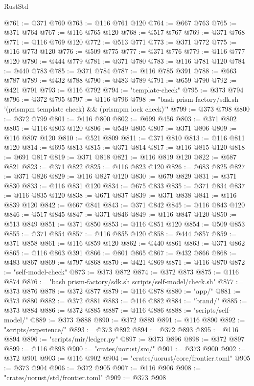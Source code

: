 \begin{lexlean}{RustStd}
\begin{coremodule}
@761 := @371 @760
@763 := @116 @761 @120
@764 := @667 @763
@765 := @371 @764
@767 := @116 @765 @120
@768 := @517 @767
@769 := @371 @768
@771 := @116 @769 @120
@772 := @513 @771
@773 := @371 @772
@775 := @116 @773 @120
@776 := @509 @775
@777 := @371 @776
@779 := @116 @777 @120
@780 := @444 @779
@781 := @371 @780
@783 := @116 @781 @120
@784 := @440 @783
@785 := @371 @784
@787 := @116 @785 @391
@788 := @663 @787
@789 := @432 @788
@790 := @483 @789
@791 := @659 @790
@792 := @421 @791
@793 := @116 @792
@794 := "template-check"
@795 := @373 @794
@796 := @372 @795
@797 := @116 @796
@798 := "bash prism-factory/sdk.sh '(prismpm template check) && (prismpm lock check)'"
@799 := @373 @798
@800 := @372 @799
@801 := @116 @800
@802 := @699 @456
@803 := @371 @802
@805 := @116 @803 @120
@806 := @549 @805
@807 := @371 @806
@809 := @116 @807 @120
@810 := @521 @809
@811 := @371 @810
@813 := @116 @811 @120
@814 := @695 @813
@815 := @371 @814
@817 := @116 @815 @120
@818 := @691 @817
@819 := @371 @818
@821 := @116 @819 @120
@822 := @687 @821
@823 := @371 @822
@825 := @116 @823 @120
@826 := @683 @825
@827 := @371 @826
@829 := @116 @827 @120
@830 := @679 @829
@831 := @371 @830
@833 := @116 @831 @120
@834 := @675 @833
@835 := @371 @834
@837 := @116 @835 @120
@838 := @671 @837
@839 := @371 @838
@841 := @116 @839 @120
@842 := @667 @841
@843 := @371 @842
@845 := @116 @843 @120
@846 := @517 @845
@847 := @371 @846
@849 := @116 @847 @120
@850 := @513 @849
@851 := @371 @850
@853 := @116 @851 @120
@854 := @509 @853
@855 := @371 @854
@857 := @116 @855 @120
@858 := @444 @857
@859 := @371 @858
@861 := @116 @859 @120
@862 := @440 @861
@863 := @371 @862
@865 := @116 @863 @391
@866 := @801 @865
@867 := @432 @866
@868 := @483 @867
@869 := @797 @868
@870 := @421 @869
@871 := @116 @870
@872 := "self-model-check"
@873 := @373 @872
@874 := @372 @873
@875 := @116 @874
@876 := "bash prism-factory/sdk.sh scripts/self-model/check.sh"
@877 := @373 @876
@878 := @372 @877
@879 := @116 @878
@880 := "app/"
@881 := @373 @880
@882 := @372 @881
@883 := @116 @882
@884 := "brand/"
@885 := @373 @884
@886 := @372 @885
@887 := @116 @886
@888 := "scripts/self-model/"
@889 := @373 @888
@890 := @372 @889
@891 := @116 @890
@892 := "scripts/experience/"
@893 := @373 @892
@894 := @372 @893
@895 := @116 @894
@896 := "scripts/mir/ledger.py"
@897 := @373 @896
@898 := @372 @897
@899 := @116 @898
@900 := "crates/uorust/src/"
@901 := @373 @900
@902 := @372 @901
@903 := @116 @902
@904 := "crates/uorust/core/frontier.toml"
@905 := @373 @904
@906 := @372 @905
@907 := @116 @906
@908 := "crates/uorust/std/frontier.toml"
@909 := @373 @908

\end{coremodule}
\end{lexlean}
